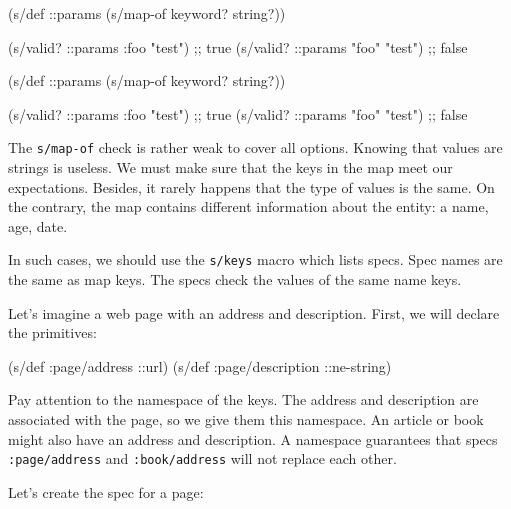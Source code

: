\ifx\DEVICETYPE\MOBILE

\begin{english}
  \begin{clojure}
(s/def ::params
  (s/map-of keyword? string?))

(s/valid? ::params
  {:foo "test"})  ;; true
(s/valid? ::params
  {"foo" "test"}) ;; false
  \end{clojure}
\end{english}

\else

\begin{english}
  \begin{clojure}
(s/def ::params
  (s/map-of keyword? string?))

(s/valid? ::params {:foo "test"})  ;; true
(s/valid? ::params {"foo" "test"}) ;; false
  \end{clojure}
\end{english}

\fi

The \verb|s/map-of| check is rather weak to cover all options. Knowing that values are strings is useless. We must make sure that the keys in the map meet our expectations. Besides, it rarely happens that the type of values is the same. On the contrary, the map contains different information about the entity: a name, age, date.


In such cases, we should use the \verb|s/keys| macro which lists specs. Spec names are the same as map keys. The specs check the values of the same name keys.

Let's imagine a web page with an address and description. First, we will declare the primitives:

\begin{english}
  \begin{clojure}
(s/def :page/address ::url)
(s/def :page/description ::ne-string)
  \end{clojure}
\end{english}


Pay attention to the namespace of the keys. The address and description are associated with the page, so we give them this namespace. An article or book might also have an address and description. A namespace guarantees that specs \verb|:page/address| and \verb|:book/address| will not replace each other.

Let's create the spec for a page:

